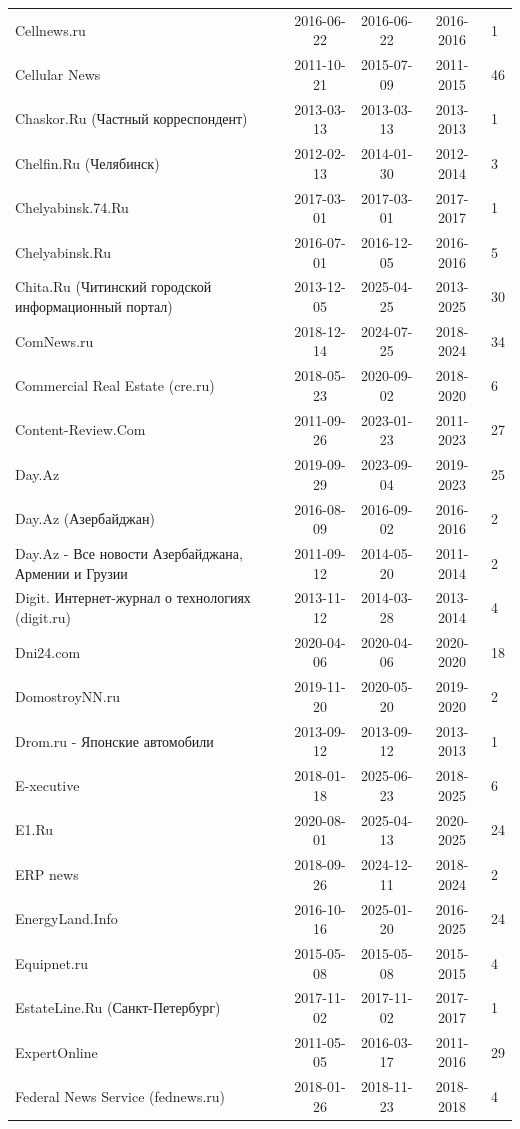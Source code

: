 \begin{longtable}{p{6cm}cccp{2cm}}
Cellnews.ru & 2016-06-22 & 2016-06-22 & 2016-2016 & 1\\
Cellular News & 2011-10-21 & 2015-07-09 & 2011-2015 & 46\\
Chaskor.Ru (Частный корреспондент) & 2013-03-13 & 2013-03-13 & 2013-2013 & 1\\
Chelfin.Ru (Челябинск) & 2012-02-13 & 2014-01-30 & 2012-2014 & 3\\
Chelyabinsk.74.Ru & 2017-03-01 & 2017-03-01 & 2017-2017 & 1\\
Chelyabinsk.Ru & 2016-07-01 & 2016-12-05 & 2016-2016 & 5\\
Chita.Ru (Читинский городской информационный портал) & 2013-12-05 & 2025-04-25 & 2013-2025 & 30\\
ComNews.ru & 2018-12-14 & 2024-07-25 & 2018-2024 & 34\\
Commercial Real Estate (cre.ru) & 2018-05-23 & 2020-09-02 & 2018-2020 & 6\\
Content-Review.Com & 2011-09-26 & 2023-01-23 & 2011-2023 & 27\\
Day.Az & 2019-09-29 & 2023-09-04 & 2019-2023 & 25\\
Day.Az (Азербайджан) & 2016-08-09 & 2016-09-02 & 2016-2016 & 2\\
Day.Az - Все новости Азербайджана, Армении и Грузии & 2011-09-12 & 2014-05-20 & 2011-2014 & 2\\
Digit. Интернет-журнал о технологиях (digit.ru) & 2013-11-12 & 2014-03-28 & 2013-2014 & 4\\
Dni24.com & 2020-04-06 & 2020-04-06 & 2020-2020 & 18\\
DomostroyNN.ru & 2019-11-20 & 2020-05-20 & 2019-2020 & 2\\
Drom.ru - Японские автомобили & 2013-09-12 & 2013-09-12 & 2013-2013 & 1\\
E-xecutive & 2018-01-18 & 2025-06-23 & 2018-2025 & 6\\
E1.Ru & 2020-08-01 & 2025-04-13 & 2020-2025 & 24\\
ERP news & 2018-09-26 & 2024-12-11 & 2018-2024 & 2\\
EnergyLand.Info & 2016-10-16 & 2025-01-20 & 2016-2025 & 24\\
Equipnet.ru & 2015-05-08 & 2015-05-08 & 2015-2015 & 4\\
EstateLine.Ru (Санкт-Петербург) & 2017-11-02 & 2017-11-02 & 2017-2017 & 1\\
ExpertOnline & 2011-05-05 & 2016-03-17 & 2011-2016 & 29\\
Federal News Service (fednews.ru) & 2018-01-26 & 2018-11-23 & 2018-2018 & 4\\

\end{longtable}

